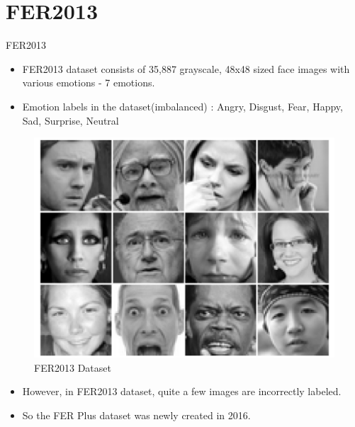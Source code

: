 \documentclass{beamer}
\begin{document}
\section{FER2013}
\begin{frame}{FER2013}
	\begin{itemize}
		\item FER2013 dataset consists of 35,887 grayscale, 48x48 sized face images with various emotions - 7 emotions.
		\item Emotion labels in the dataset(imbalanced) : Angry, Disgust, Fear, Happy, Sad, Surprise, Neutral
	\end{itemize}
	\vspace{10pt}
	\begin{figure}[h]		
		\centering
		\includegraphics[scale=0.22]{./fer/FER2013.PNG}
		\caption{FER2013 Dataset}
		\label{ilsvrc:images}
	\end{figure}
	\begin{itemize}
		\item However, in FER2013 dataset, quite a few images are incorrectly labeled.
		\item So the FER Plus dataset was newly created in 2016.
	\end{itemize}
\end{frame}
\end{document}
